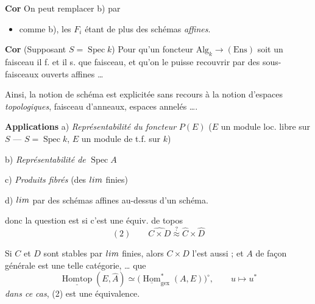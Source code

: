 \documentclass[11pt,a4paper]{article}
\begin{document}
\textbf{Cor} On peut \struck{\ill{}} remplacer b) par

\begin{itemize}
  \item[b')] comme b), les $F_i$ étant de plus des schémas \emph{affines}.
\end{itemize}

\textbf{Cor} (Supposant $S = \operatorname{Spec} k$) Pour qu'un foncteur $\mathrm{Alg}_k \to (\mathrm{Ens})$ soit un faisceau il f. et il s. que \struck{\ill{}}  faisceau, et qu'on le puisse recouvrir par des sous-faisceaux ouverts affines …

Ainsi, la notion de schéma est explicitée sans recours à la notion d'espaces \emph{topologiques}, faisceau d'anneaux, espaces  annelés ….

\textbf{Applications} a) \emph{Représentabilité du \emph{foncteur}} $P(E)$ ($E$ un module loc. libre sur $S$ ---  $S = \operatorname{Spec} k$, $E$ un module de t.f. sur $k$)

b) \emph{Représentabilité de} $\operatorname{Spec} A$

c) \emph{Produits fibrés} (des $\varprojlim$ finies)

d) $\varprojlim$  par des schémas affines au-dessus d'un schéma.



donc la question est si c'est une équiv. de topos
\[
(2) \qquad \widehat{C \times D} \overset{?}{\approx} \widehat{C} \times \widehat{D}
\]

Si $C$ et $D$ sont stables par $\varprojlim$ finies, alors $C \times D$ l'est aussi ; et  $A$ de façon générale  est une telle catégorie, \ldots{}  que
\[
\underline{\operatorname{Homtop}}(E, \widehat{A}) \simeq \bigl(\underline{\operatorname{Hom}}^{*}_{\mathrm{gex}}(A, E)\bigr)^{\circ}, \qquad u \longmapsto u^{*}
\]
  \emph{dans ce cas}, (2) est une équivalence.
\end{document}
